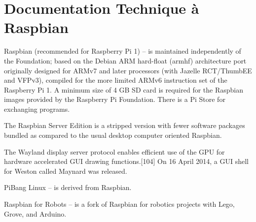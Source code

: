 
\chapter{Documentation Technique à Raspbian}
\label{annexe:raspbian}

Raspbian (recommended for Raspberry Pi 1) – is maintained independently of the Foundation; based on the Debian ARM hard-float (armhf) architecture port originally designed for ARMv7 and later processors (with Jazelle RCT/ThumbEE and VFPv3), compiled for the more limited ARMv6 instruction set of the Raspberry Pi 1. A minimum size of 4 GB SD card is required for the Raspbian images provided by the Raspberry Pi Foundation. There is a Pi Store for exchanging programs.

    The Raspbian Server Edition is a stripped version with fewer software packages bundled as compared to the usual desktop computer oriented Raspbian.

    The Wayland display server protocol enables efficient use of the GPU for hardware accelerated GUI drawing functions.[104] On 16 April 2014, a GUI shell for Weston called Maynard was released.

    PiBang Linux – is derived from Raspbian.

    Raspbian for Robots – is a fork of Raspbian for robotics projects with Lego, Grove, and Arduino.

